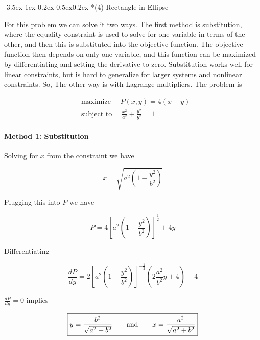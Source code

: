 \documentclass[11pt,letterpaper,onecolumn,notitlepage]{article}
\makeatletter
\renewcommand\subsection{\@startsection{subsection}{1}{\z@}%
{-3.5ex\@plus-1ex\@minus-0.2ex}%
{0.5ex\@plus0.2ex}%
{\fontsize{10pt}{10pt}\selectfont\bfseries\sffamily}}
\makeatother
\begin{document}
\subsection*{(4) Rectangle in Ellipse}

For this problem we can solve it two ways.
The first method is substitution, where the equality constraint is used to solve for one variable in terms of the other, and then this is substituted into the objective function.
The objective function then depends on only one variable, and this function can be maximized by differentiating and setting the derivative to zero.
Substitution works well for linear constraints, but is hard to generalize for larger systems and nonlinear constraints.
So, The other way is with Lagrange multipliers.
The problem is

\begin{align*}
  &\text{maximize }\quad P(x,y)=4(x+y) \\
  &\text{subject to }\quad\frac{x^{2}}{a^{2}}+\frac{y^{2}}{b^{2}}=1
\end{align*}

\paragraph{Method 1: Substitution}

Solving for $x$ from the constraint we have

\begin{equation*}
  x=\sqrt{a^{2}\left(1-\frac{y^{2}}{b^{2}}\right)}
\end{equation*}

Plugging this into $P$ we have

\begin{equation*}
  P=4\left[a^{2}\left(1-\frac{y^{2}}{b^{2}}\right)\right]^{\frac{1}{2}}+4y
\end{equation*}

Differentiating

\begin{equation*}
  \frac{dP}{dy}=2\left[a^{2}\left(1-\frac{y^{2}}{b^{2}}\right)\right]^{-\frac{1}{2}}\left(2\frac{a^{2}}{b^{2}}y+4\right)+4
\end{equation*}

$\frac{dP}{dy}=0$ implies

\begin{equation*}
  \boxed{%
  y=\frac{b^{2}}{\sqrt{a^{2}+b^{2}}}
  \qquad\text{and}\qquad
  x=\frac{a^{2}}{\sqrt{a^{2}+b^{2}}}}
\end{equation*}
\end{document}
